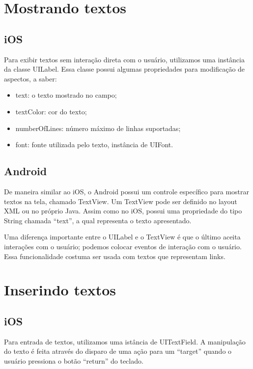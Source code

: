     

    \section {Mostrando textos}
    \subsection{iOS}
    
	Para exibir textos sem interação direta com o usuário, utilizamos uma instância da classe UILabel. Essa classe possui algumas propriedades para modificação de aspectos, a saber:
\begin{itemize}
\item text: o texto mostrado no campo;
\item textColor: cor do texto;
\item numberOfLines: número máximo de linhas suportadas;
\item font: fonte utilizada pelo texto, instância de UIFont.
\end{itemize}     
   
    \subsection{Android}
     
    De maneira similar ao iOS, o Android possui um controle específico para mostrar textos na tela, chamado TextView. Um TextView pode ser definido no layout \ac{XML} ou no próprio Java. Assim como no iOS, possui uma propriedade do tipo String chamada ``text'', a qual representa o texto apresentado.%
    
   
    Uma diferença importante entre o UILabel e o TextView é que o último aceita interações com o usuário; podemos colocar eventos de interação com o usuário. Essa funcionalidade costuma ser usada com textos que representam links.
     
    \section {Inserindo textos}
     
    \subsection{iOS}
            Para entrada de textos, utilizamos uma istância de UITextField. A manipulação do texto é feita através do disparo de uma ação para um ``target'' quando o usuário pressiona o botão ``return'' do teclado.
    
